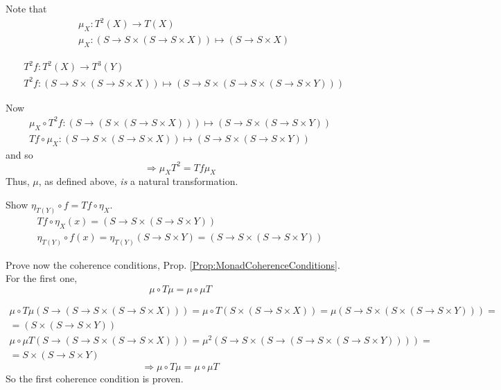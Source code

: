 \documentclass[10pt]{amsart}
\begin{document}
\begin{multicols*}{2}
Note that 
\begin{equation}
	\begin{aligned}
	& \mu_X : T^2(X) \to T(X) \\ 
	& \mu_X : (S \to S \times (S \to S \times X)) \mapsto (S \to S \times X)
	\end{aligned}
\end{equation} 

\begin{equation}
\begin{aligned}
& T^2 f : T^2(X) \to T^3(Y) \\  
& T^2 f: (S \to S \times (S \to S\times X)) \mapsto (S \to S \times (S \to S \times (S \to S \times Y)))
\end{aligned}
\end{equation}

Now
\[
\begin{gathered} 
 \mu_X \circ T^2 f : (S \to (S \times (S \to S \times X))) \mapsto (S \to S \times (S \to S \times Y)) \\ 
 Tf \circ \mu_X : (S \to S \times (S \to S \times X)) \mapsto (S \to S \times (S \to S \times Y))
\end{gathered} 
\]
and so 
\[
\Longrightarrow \mu_X T^2 = Tf \mu_X 
\]
Thus, $\mu$, as defined above, \emph{is} a natural transformation.

Show $\eta_{T(Y)} \circ f = Tf\circ \eta_X$. 
\[
\begin{gathered} 
	Tf \circ \eta_X (x) = (S \to S \times (S \to S \times Y)) \\ 
 \eta_{T(Y)} \circ f(x) = \eta_{T(Y)} (S \to S \times Y) = (S \to S \times (S \to S \times Y))
\end{gathered} 
\]

Prove now the coherence conditions, Prop. \ref{Prop:MonadCoherenceConditions}. For the first one,
\[
\mu \circ T \mu = \mu \circ \mu T
\]

\[
\begin{gathered} 
	\mu \circ T \mu (S \to (S \to S \times (S\to S \times X))) = \mu \circ T (S \times (S \to S \times X)) = \mu (S \to S \times (S \times (S \to S \times Y))) = \\
	= (S \times (S \to S \times Y)) \\ 
 \mu\circ \mu T (S \to (S \to S \times (S\to S \times X))) = \mu^2 (S \to S \times (S \to (S \to S \times (S \to S \times Y)))) = \\
 	= S \times (S \to S \times Y)
\end{gathered} 
\]
\[
\Longrightarrow \mu \circ T \mu = \mu \circ \mu T
\]
So the first coherence condition is proven.


\end{multicols*}
\end{document}
